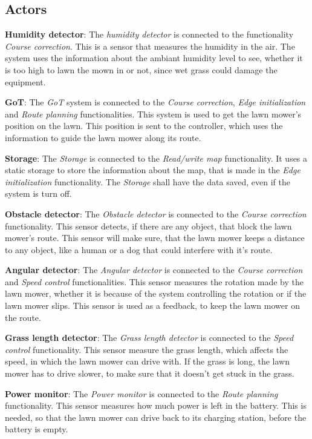 \subsection{Actors}

\textbf{Humidity detector}:
The \textit{humidity detector} is connected to the functionality \textit{Course correction}. This is a sensor that measures the humidity in the air. The system uses the information about the ambiant humidity level to see, whether it is too high to lawn the mown in or not, since wet grass could damage the equipment. 

\textbf{GoT}:
The \textit{GoT} system is connected to the \textit{Course correction}, \textit{Edge initialization} and \textit{Route planning} functionalities. This system is used to get the lawn mower's position on the lawn. This position is sent to the controller, which uses the information to guide the lawn mower along its route.

\textbf{Storage}:
The \textit{Storage} is connected to the \textit{Read/write map} functionality. It uses a static storage to store the information about the map, that is made in the \textit{Edge initialization} functionality. The \textit{Storage} shall have the data saved, even if the system is turn off.

\textbf{Obstacle detector}:
The \textit{Obstacle detector} is connected to the \textit{Course correction} functionality. This sensor detects, if there are any object, that block the lawn mower's route. This sensor will make sure, that the lawn mower keeps a distance to any object, like a human or a dog that could interfere with it's route.

\textbf{Angular detector}:
The \textit{Angular detector} is connected to the \textit{Course correction} and \textit{Speed control} functionalities. This sensor measures the rotation made by the lawn mower, whether it is because of the system controlling the rotation or if the lawn mower slips. This sensor is used as a feedback, to keep the lawn mower on the route.

\textbf{Grass length detector}:
The \textit{Grass length detector} is connected to the \textit{Speed control} functionality. This sensor measure the  grass length, which affects the speed, in which the lawn mower can drive with. If the grass is long, the lawn mower has to drive slower, to make sure that it doesn't get stuck in the grass. 

\textbf{Power monitor}:
The \textit{Power monitor} is connected to the \textit{Route planning} functionality. This sensor measures how much power  is left in the battery. This is needed, so that the lawn mower can drive back to its charging station, before the battery is empty.





